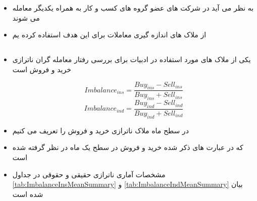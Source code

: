 \documentclass[12pt, a4paper]{article}
\begin{document}
\FloatBarrier


\section{ }
\begin{itemize}
	\item 
	به نظر می آید در شرکت های عضو گروه های کسب و کار به همراه یکدیگر معامله می شوند
	\item
	از ملاک های اندازه گیری معاملات برای این هدف استفاده کرده یم
\end{itemize}

 \subsection{}
 \begin{itemize}
 	\item 
 	یکی از ملاک های مورد استفاده در ادبیات برای بررسی رفتار معامله گران  ناترازی خرید و فروش است
 	
 
 		\begin{equation}
 			Imbalance_{ins} = \frac{Buy_{ins} - Sell_{ins}}{Buy_{ins} + Sell_{ins}}
 		\end{equation}
 	\begin{equation}
 		Imbalance_{ind} = \frac{Buy_{ind} - Sell_{ind}}{Buy_{ind} + Sell_{ind}}
 	\end{equation}
 	\item 
 	در سطح ماه ملاک ناترازی خرید و فروش را تعریف می کنیم
 	\item 
 	که در عبارت های ذکر شده خرید و فروش در سطح یک ماه در نظر گرفته شده است
 	\item 
 	مشخصات آماری ناترازی حقیقی و حقوقی در جداول 
 	\ref{tab:ImbalanceInsMeanSummary}
 	و
 	\ref{tab:ImbalanceIndMeanSummary}
 	بیان شده است
  	\begin{LTR}
 \end{LTR}
 \begin{LTR}
 \end{LTR}
 \end{itemize}
 \FloatBarrier
 
\end{document}
